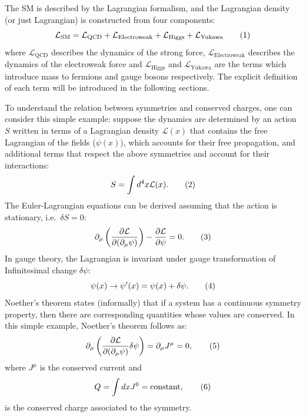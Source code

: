 The SM is described by the Lagrangian formalism, and the Lagrangian density (or just Lagrangian)
is constructed from four components:
\[
    \mathcal{L}_{\text{SM}} = \mathcal{L}_{\text{QCD}} + \mathcal{L}_{\text{Electroweak}} + \mathcal{L}_{\text{Higgs}}
    + \mathcal{L}_{\text{Yukawa}}
\addtag \]
where $\mathcal{L}_{\text{QCD}}$ describes the dynamics of the strong force, 
$\mathcal{L}_{\text{Electroweak}}$ describes the dynamics
of the electroweak force and 
$\mathcal{L}_{\text{Higgs}}$ and $\mathcal{L}_{\text{Yukawa}}$
are the terms which introduce mass to fermions and gauge bosons respectively.
The explicit definition of each term will be introduced in the following sections. 

To understand the relation between symmetries and conserved charges, 
one can consider this simple example: 
suppose the dynamics are determined by an action $S$ written in terms of a Lagrangian density
$\mathcal{L}(x)$ that contains the free Lagrangian of the fields ($\psi(x)$),
which accounts for their free propagation, and additional terms that 
respect the above symmetries and account for their interactions:
\[
    S = \int d^4x \mathcal{L}(x) .\addtag \]
The Euler-Lagrangian equations can be derived assuming that the action is stationary, 
i.e.\ $\delta S =0$:
\[
    \partial_\mu \left(\frac{\partial \mathcal{L} }{\partial(\partial_\mu \psi)}\right) - \frac{\partial \mathcal{L}}{\partial \psi} = 0 .
    \addtag \]
In gauge theory, the Lagrangian is invariant under gauge transformation of Infinitesimal change $\delta\psi$:
\[
    \psi(x) \rightarrow \psi'(x) =  \psi(x) + \delta\psi .
    \addtag \]
Noether's theorem states (informally) that
if a system has a continuous symmetry property, 
then there are corresponding quantities whose values are conserved.
In this simple example, Noether's theorem follows as:
\[
    \partial_\mu \left(\frac{\partial \mathcal{L} }{\partial(\partial_\mu \psi)}  \delta \psi \right) = \partial_\mu J^\mu =  0 ,
    \addtag \]
where $J^\mu$ is the conserved current and 
\[
Q = \int dx J^0 = \text{constant},     
\addtag \]
is the conserved charge associated to the symmetry. 




